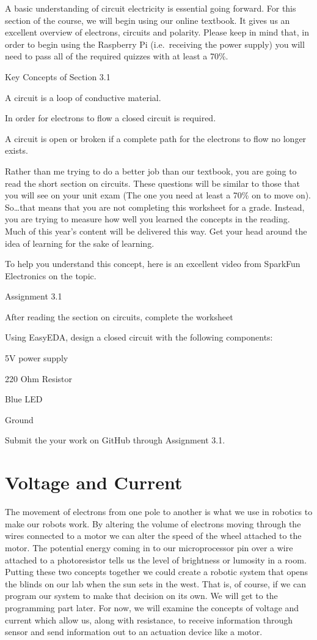 \documentclass[
]{book}
\begin{document}
A basic understanding of circuit electricity is essential going forward. For this section of the course, we will begin using our online textbook. It gives us an excellent overview of electrons, circuits and polarity. Please keep in mind that, in order to begin using the Raspberry Pi (i.e.~receiving the power supply) you will need to pass all of the required quizzes with at least a 70\%.

Key Concepts of Section 3.1

A circuit is a loop of conductive material.

In order for electrons to flow a closed circuit is required.

A circuit is open or broken if a complete path for the electrons to flow no longer exists.

Rather than me trying to do a better job than our textbook, you are going to read the short section on circuits. These questions will be similar to those that you will see on your unit exam (The one you need at least a 70\% on to move on). So\ldots that means that you are not completing this worksheet for a grade. Instead, you are trying to measure how well you learned the concepts in the reading. Much of this year's content will be delivered this way. Get your head around the idea of learning for the sake of learning.

To help you understand this concept, here is an excellent video from SparkFun Electronics on the topic.

Assignment 3.1

After reading the section on circuits, complete the worksheet

Using EasyEDA, design a closed circuit with the following components:

5V power supply

220 Ohm Resistor

Blue LED

Ground

Submit the your work on GitHub through Assignment 3.1.

\hypertarget{voltage-and-current}{%
\section{Voltage and Current}\label{voltage-and-current}}

The movement of electrons from one pole to another is what we use in robotics to make our robots work. By altering the volume of electrons moving through the wires connected to a motor we can alter the speed of the wheel attached to the motor. The potential energy coming in to our microprocessor pin over a wire attached to a photoresistor tells us the level of brightness or lumosity in a room. Putting these two concepts together we could create a robotic system that opens the blinds on our lab when the sun sets in the west. That is, of course, if we can program our system to make that decision on its own. We will get to the programming part later. For now, we will examine the concepts of voltage and current which allow us, along with resistance, to receive information through sensor and send information out to an actuation device like a motor.
\end{document}
